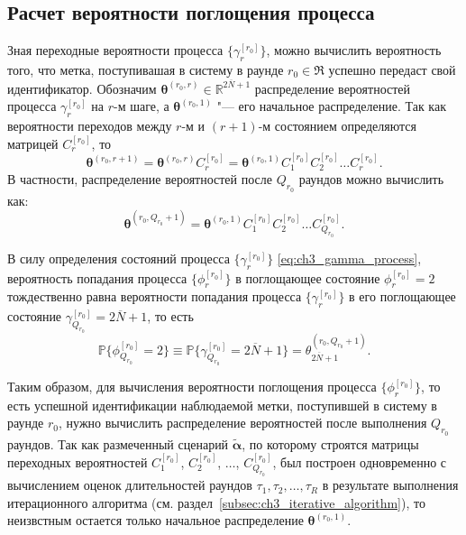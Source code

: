 \subsection{Расчет вероятности поглощения процесса}
Зная переходные вероятности процесса $\{ \gamma_r^{[r_0]} \}$, можно вычислить вероятность того, что метка, поступивашая в систему в раунде $r_0 \in \mathfrak{R}$ успешно передаст свой идентификатор. Обозначим $\bm{\theta}^{(r_0,r)} \in \mathbb{R}^{2\overline{N}+1}$ распределение вероятностей процесса $\gamma_r^{[r_0]}$ на $r$-м шаге, а $\bm{\theta}^{(r_0,1)}$ "--- его начальное распределение. Так как вероятности переходов между $r$-м и $(r+1)$-м состоянием определяются матрицей $C_r^{[r_0]}$, то
$$
\bm{\theta}^{(r_0,r+1)} = \bm{\theta}^{(r_0,r)} C_{r}^{[r_0]} = \bm{\theta}^{(r_0,1)} C_1^{[r_0]} C_2^{[r_0]} \dots C_r^{[r_0]}.
$$
В частности, распределение вероятностей после $Q_{r_0}$ раундов можно вычислить как:
$$
\bm{\theta}^{(r_0, Q_{r_0} + 1)} = \bm{\theta}^{(r_0, 1)} C^{[r_0]}_1 C^{[r_0]}_2 \dots C^{[r_0]}_{Q_{r_0}}.
$$

В силу определения состояний процесса $\{ \gamma_r^{[r_0]} \}$ \eqref{eq:ch3_gamma_process}, вероятность попадания процесса $\{ \phi_r^{[r_0]} \}$ в поглощающее состояние $\phi_r^{[r_0]} = 2$ тождественно равна вероятности попадания процесса $\{ \gamma_r^{[r_0]} \}$ в его поглощающее состояние $\gamma_{Q_{r_0}}^{[r_0]} = 2\overline{N}+1$, то есть
$$
	\mathbb{P}\{ \phi_{Q_{r_0}}^{[r_0]} = 2 \} \equiv \mathbb{P}\{ \gamma_{Q_{r_0}}^{[r_0]} = 2\overline{N}+1 \} = \theta_{2\overline{N}+1}^{(r_0, Q_{r_0}+1)}.
$$

Таким образом, для вычисления вероятности поглощения процесса $\{ \phi_r^{[r_0]} \}$, то есть успешной идентификации наблюдаемой метки, поступившей в систему в раунде $r_0$, нужно вычислить распределение вероятностей после выполнения $Q_{r_0}$ раундов. Так как размеченный сценарий $\widetilde{\bm{\alpha}}$, по которому строятся матрицы переходных вероятностей $C^{[r_0]}_1$, $C^{[r_0]}_2$, $\dots$, $C^{[r_0]}_{Q_{r_0}}$, был построен одновременно с вычислением оценок длительностей раундов $\tau_1, \tau_2, \dots, \tau_R$ в результате выполнения итерационного алгоритма (см. раздел~\ref{subsec:ch3_iterative_algorithm}), то неизвстным остается только начальное распределение $\bm{\theta}^{(r_0, 1)}$.

